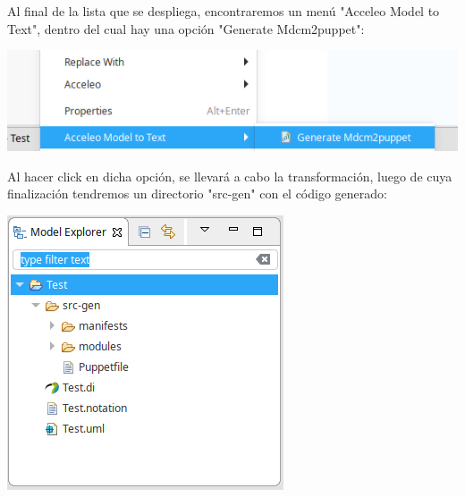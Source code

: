 \documentclass[11pt]{article}
\begin{document}
Al final de la lista que se despliega, encontraremos un menú "Acceleo
Model to Text", dentro del cual hay una opción "Generate Mdcm2puppet":

\begin{center}
\includegraphics[width=.9\linewidth]{images/transformacion_2.png}
\end{center}

Al hacer click en dicha opción, se llevará a cabo la transformación,
luego de cuya finalización tendremos un directorio "src-gen" con el
código generado:

\begin{center}
\includegraphics[width=.9\linewidth]{images/transformacion_3.png}
\end{center}
\end{document}
